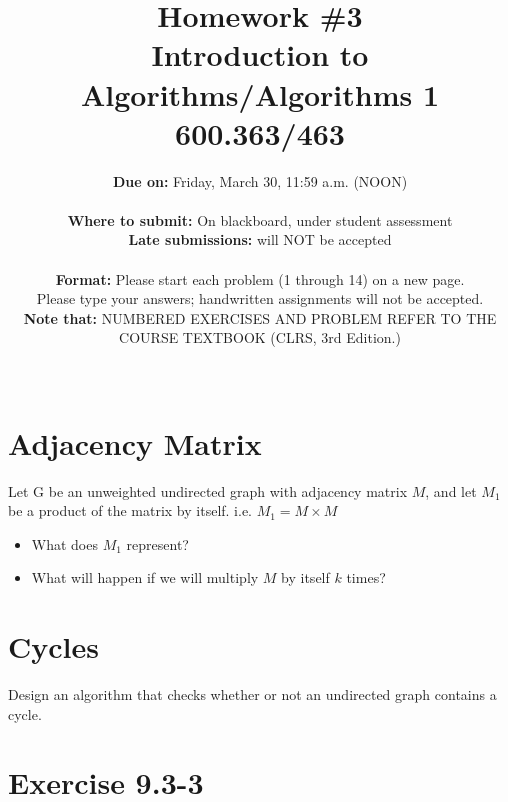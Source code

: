 \documentclass[letterpaper, 11pt]{article}
\begin{document}
\title{Homework \#3 \\ Introduction to Algorithms/Algorithms 1 \\ 600.363/463 }
\author{\textbf{Due on:} Friday, March 30, 11:59 a.m. (NOON)\\
\\\textbf{Where to submit:} On blackboard, under student assessment
\\ \textbf{Late submissions:} will NOT be accepted\\
\\ \textbf{Format:} Please start each problem (1 through 14) on a new page. 
\\ Please type your answers; handwritten assignments will not be accepted.
\\ \textbf{Note that:} NUMBERED EXERCISES AND PROBLEM REFER TO THE \\ COURSE TEXTBOOK (CLRS, 3rd Edition.)\\
\\}

\maketitle


\section{Adjacency Matrix}
Let G be an unweighted undirected graph with adjacency matrix $M$, and let $M_1$ be a product of the matrix by itself. i.e. $M_1 = M\times M$
\begin{itemize}
\item{What does $M_1$ represent?}
\item{What will happen if we will multiply $M$ by itself $k$ times?}
\end{itemize}
\eject

\section{Cycles} 
Design an algorithm that checks whether or not an undirected graph contains a cycle.

\section{Exercise 9.3-3} 
\end{document}
